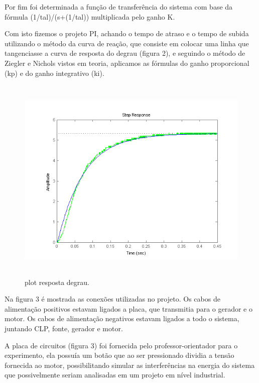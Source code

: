 \documentclass[12pt,a4paper]{article}
\begin{document}
Por fim foi determinada a função de transferência do sistema com base da fórmula (1/tal)/(s+(1/tal)) multiplicada pelo ganho K.
	
Com isto fizemos o projeto PI, achando o tempo de atraso e o tempo de subida utilizando o método da curva de reação, que consiste em colocar uma linha que tangenciasse a curva de resposta do degrau (figura 2), e seguindo o método de Ziegler e Nichols vistos em teoria, aplicamos as fórmulas do ganho proporcional (kp) e do ganho integrativo (ki).

\begin{figure}[H]
    \centering
    \caption{plot resposta degrau.}
    \label{fig:2}
    \includegraphics[height=10cm]{figuras/untitled.png} %
\end{figure}
	
Na figura 3 é mostrada as conexões utilizadas no projeto. Os cabos de alimentação positivos estavam ligados a placa, que transmitia para o gerador e o motor. Os cabos de alimentação negativos estavam ligados a todo o sistema, juntando CLP, fonte, gerador e motor. 
	
A placa de circuitos (figura 3) foi fornecida pelo professor-orientador para o experimento, ela possuía um botão que ao ser pressionado dividia a tensão fornecida ao motor, possibilitando simular as interferências na energia do sistema que possivelmente seriam analisadas em um projeto em nível industrial.
\end{document}
